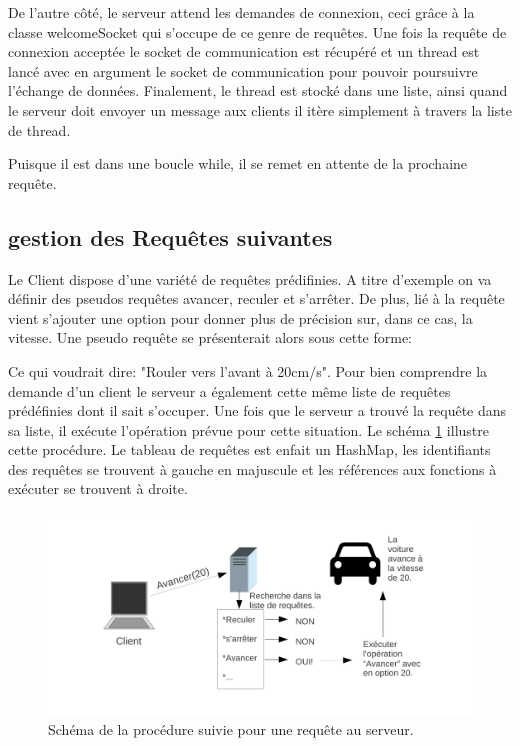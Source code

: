 \documentclass[a4paper,11pt]{report}
\begin{document}
{

De l'autre côté, le serveur attend les demandes de connexion, ceci grâce à la classe welcomeSocket qui s'occupe de ce genre de requêtes. Une fois la requête de connexion acceptée le socket de communication est récupéré et un thread est lancé avec en argument le socket de communication pour pouvoir poursuivre l'échange de données. Finalement, le thread est stocké dans une liste, ainsi quand le serveur doit envoyer un message aux clients il itère simplement à travers la liste de thread.

 
 
 Puisque il est dans une boucle while, il se remet en attente de la prochaine requête.
 
 \subsection{gestion des Requêtes suivantes}
 Le Client dispose d'une variété de requêtes prédifinies. A titre d'exemple on va définir des pseudos requêtes avancer, reculer et s'arrêter. De plus, lié à la requête vient s'ajouter une option pour donner plus de précision sur, dans ce cas, la vitesse. Une pseudo requête se présenterait alors sous cette forme:
 
 
 Ce qui voudrait dire: "Rouler vers l'avant à 20cm/s".  Pour bien comprendre la demande d'un client le serveur a également cette même liste de requêtes prédéfinies dont il sait s'occuper. Une fois que le serveur a trouvé la requête dans sa liste, il exécute l'opération prévue pour cette situation. Le schéma \ref{RequestHandler} illustre cette procédure.
  Le tableau de requêtes est enfait un HashMap, les identifiants des requêtes se trouvent à gauche en majuscule et les références aux fonctions à exécuter se trouvent à droite.
 
 
 
 \begin{figure}[!h]
\includegraphics[width=1.0\textwidth]{figures/RequestHandler.pdf}
\caption[Gestion de requête au serveur]{\label{RequestHandler}Schéma de la procédure suivie pour une requête au serveur.}
\end{figure}
 
}
\end{document}

